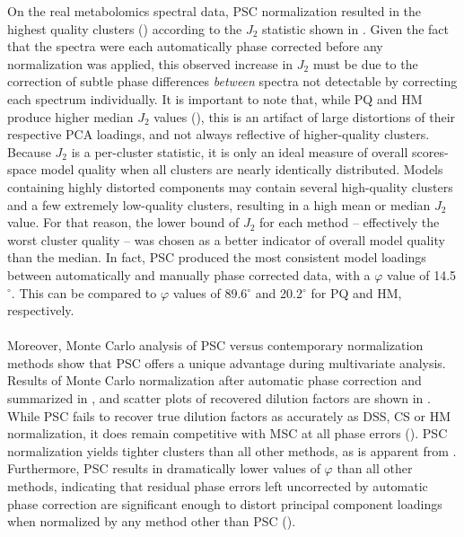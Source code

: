 \begin{doublespace}
On the real metabolomics spectral data, PSC normalization resulted in the
highest quality clusters () according to the $J_2$
statistic shown in . Given the fact that the spectra
were each automatically phase corrected before any normalization was applied,
this observed increase in $J_2$ must be due to the correction of subtle phase
differences \emph{between} spectra not detectable by correcting each spectrum
individually. It is important to note that, while PQ and HM produce higher
median $J_2$ values (), this is an artifact of large
distortions of their respective PCA loadings, and not always reflective of
higher-quality clusters. Because $J_2$ is a per-cluster statistic, it is
only an ideal measure of overall scores-space model quality when all
clusters are nearly identically distributed. Models containing highly
distorted components may contain several high-quality clusters and a
few extremely low-quality clusters, resulting in a high mean or
median $J_2$ value. For that reason, the lower bound of $J_2$ for
each method -- effectively the worst cluster quality -- was chosen as a better
indicator of overall model quality than the median. In fact, PSC produced the
most consistent model loadings between automatically and manually phase
corrected data, with a $\varphi$ value of 14.5$^\circ$. This can be compared to
$\varphi$ values of 89.6$^\circ$ and 20.2$^\circ$ for PQ and HM, respectively.
\\\\
Moreover, Monte Carlo analysis of PSC versus contemporary normalization methods
show that PSC offers a unique advantage during multivariate analysis. Results
of Monte Carlo normalization after automatic phase correction and summarized
in , and scatter plots of recovered dilution factors
are shown in . While PSC fails to recover true
dilution factors as accurately as DSS, CS or HM normalization, it does
remain competitive with MSC at all phase errors ().
PSC normalization yields tighter clusters than all other methods, as is
apparent from . Furthermore, PSC results in
dramatically lower values of $\varphi$ than all other methods, indicating that
residual phase errors left uncorrected by automatic phase correction are
significant enough to distort principal component loadings when normalized by
any method other than PSC ().
\end{doublespace}

